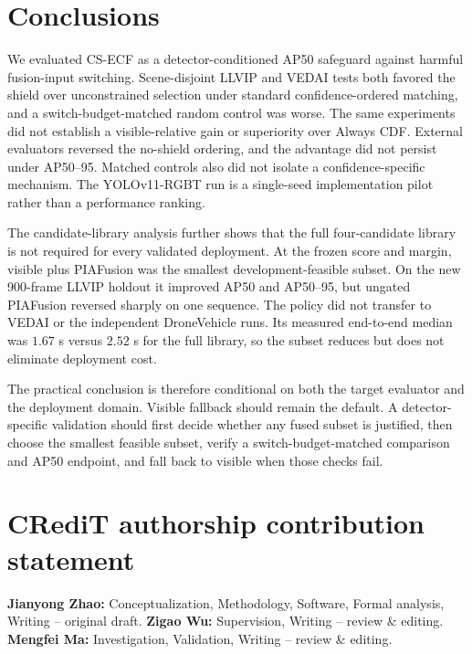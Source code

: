 \documentclass[preprint,11pt]{elsarticle}
\begin{document}





\section{Conclusions}

We evaluated CS-ECF as a detector-conditioned AP50 safeguard against harmful
fusion-input switching. Scene-disjoint LLVIP and VEDAI tests both favored the
shield over unconstrained selection under standard confidence-ordered matching,
and a switch-budget-matched random control was worse. The same experiments did
not establish a visible-relative gain or superiority over Always CDF. External
evaluators reversed the no-shield ordering, and the advantage did not persist
under AP50--95. Matched controls also did not isolate a confidence-specific
mechanism. The YOLOv11-RGBT run is a single-seed implementation pilot rather
than a performance ranking.

The candidate-library analysis further shows that the full four-candidate
library is not required for every validated deployment. At the frozen score
and margin, visible plus PIAFusion was the smallest development-feasible
subset. On the new 900-frame LLVIP holdout it improved AP50 and AP50--95, but
ungated PIAFusion reversed sharply on one sequence. The policy did not transfer
to VEDAI or the independent DroneVehicle runs. Its measured end-to-end median
was \(1.67\) s versus \(2.52\) s for the full library, so the subset reduces
but does not eliminate deployment cost.

The practical conclusion is therefore conditional on both the target
evaluator and the deployment domain. Visible fallback should remain the
default. A detector-specific validation should first decide whether any fused
subset is justified, then choose the smallest feasible subset, verify a
switch-budget-matched comparison and AP50 endpoint, and fall back to visible
when those checks fail.

\section*{CRediT authorship contribution statement}

\textbf{Jianyong Zhao:} Conceptualization, Methodology, Software, Formal
analysis, Writing -- original draft. \textbf{Zigao Wu:} Supervision, Writing
-- review \& editing. \textbf{Mengfei Ma:} Investigation, Validation,
Writing -- review \& editing.
\end{document}
